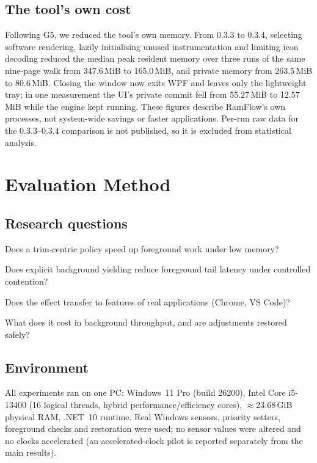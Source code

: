 \documentclass[11pt]{article}
\begin{document}
\subsection{The tool's own cost}
\label{sec:selfcost}
Following G5, we reduced the tool's own memory. From 0.3.3 to 0.3.4, selecting software rendering, lazily initialising unused instrumentation and limiting icon decoding reduced the median peak resident memory over three runs of the same nine-page walk from 347.6\,MiB to 165.0\,MiB, and private memory from 263.5\,MiB to 80.6\,MiB. Closing the window now exits WPF and leaves only the lightweight tray; in one measurement the UI's private commit fell from 55.27\,MiB to 12.57\,MiB while the engine kept running. These figures describe RamFlow's own processes, not system-wide savings or faster applications. Per-run raw data for the 0.3.3--0.3.4 comparison is not published, so it is excluded from statistical analysis.

\section{Evaluation Method}
\label{sec:method}

\subsection{Research questions}
\begin{description}[leftmargin=2.6em,style=sameline,itemsep=1pt]
  \item[RQ1] Does a trim-centric policy speed up foreground work under low memory?
  \item[RQ2] Does explicit background yielding reduce foreground tail latency under controlled contention?
  \item[RQ3] Does the effect transfer to features of real applications (Chrome, VS Code)?
  \item[RQ4] What does it cost in background throughput, and are adjustments restored safely?
\end{description}

\subsection{Environment}
All experiments ran on one PC: Windows~11 Pro (build 26200), Intel Core i5-13400 (16 logical threads, hybrid performance/efficiency cores), $\approx$23.68\,GiB physical RAM, .NET~10 runtime. Real Windows sensors, priority setters, foreground checks and restoration were used; no sensor values were altered and no clocks accelerated (an accelerated-clock pilot is reported separately from the main results).
\end{document}
